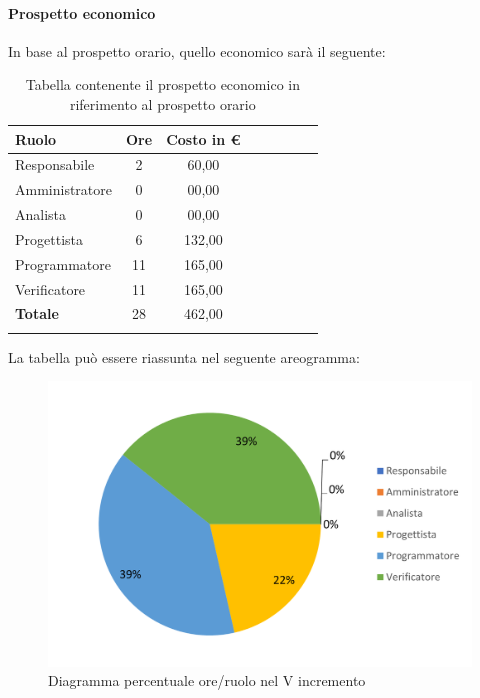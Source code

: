 \paragraph{Prospetto economico}
In base al prospetto orario, quello economico sarà il seguente:

\begin{longtable}{|l|c|c|c|c|c|c|c|}
	\hline
	\rowcolor{lighter-grayer}
	\textbf{Ruolo}  & \textbf{Ore} & \textbf{Costo in €} \\
	\hline
	\endfirsthead

	\hline
	Responsabile    & 2            & 60,00              \\
	\hline
	\hline
	Amministratore  & 0           & 00,00              \\
	\hline
	\hline
	Analista        & 0           & 00,00              \\
	\hline
	\hline
	Progettista     & 6            & 132,00                   \\
	\hline
	\hline
	Programmatore   & 11            & 165,00                   \\
	\hline
	\hline
	Verificatore    & 11           & 165,00              \\
	\hline
	\hline
	\textbf{Totale} & 28           & 462,00            \\
	\hline
	\rowcolor{white}
	\caption{Tabella contenente il prospetto economico in riferimento al prospetto orario}
\end{longtable}
\pagebreak

La tabella può essere riassunta nel seguente areogramma:
\begin{figure}[H]
	\centering
	\includegraphics[width=0.8\linewidth]{res/images/preventivo/dettaglio_implementazione/2-2.png}
	\caption{Diagramma percentuale ore/ruolo nel V incremento}
	\label{fig:diagramma costi ruolo V incremento}
\end{figure}

